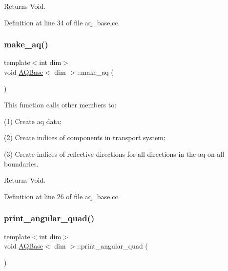 \begin{DoxyReturn}{Returns}
Void. 
\end{DoxyReturn}


Definition at line 34 of file aq\+\_\+base.\+cc.

\mbox{\label{class_a_q_base_ad8bf7c63bde67a2f514aea2c589983dd}} 
\subsubsection{\texorpdfstring{make\+\_\+aq()}{make\_aq()}}
{\footnotesize\ttfamily template$<$int dim$>$ \\
void \hyperlink{class_a_q_base}{A\+Q\+Base}$<$ dim $>$\+::make\+\_\+aq (\begin{DoxyParamCaption}{ }\end{DoxyParamCaption})}

This function calls other members to\+:

(1) Create aq data;

(2) Create indices of components in transport system;

(3) Create indices of reflective directions for all directions in the aq on all boundaries.

\begin{DoxyReturn}{Returns}
Void. 
\end{DoxyReturn}


Definition at line 26 of file aq\+\_\+base.\+cc.

\mbox{\label{class_a_q_base_adbe2961a0c0db888ca6a22ead08732eb}} 
\subsubsection{\texorpdfstring{print\+\_\+angular\+\_\+quad()}{print\_angular\_quad()}}
{\footnotesize\ttfamily template$<$int dim$>$ \\
void \hyperlink{class_a_q_base}{A\+Q\+Base}$<$ dim $>$\+::print\+\_\+angular\+\_\+quad (\begin{DoxyParamCaption}{ }\end{DoxyParamCaption})}

